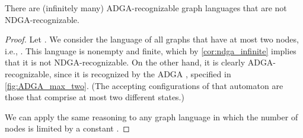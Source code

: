 \documentclass[a4paper,11pt,twoside]{report} \pdfoutput=1
\begin{document}
\begin{lemma}[] \label{lem:ndga<adga}
  There are (infinitely many) ADGA-recognizable graph languages that
  are not NDGA-recognizable.
\end{lemma}

\begin{proof}
  Let . We consider the language  of all
  graphs that have at most two nodes, i.e.,
  . This language is nonempty and finite, which by
  \cref{cor:ndga_infinite} implies that it is not
  NDGA-recognizable. On the other hand, it is clearly
  ADGA-recognizable, since it is recognized by the ADGA ,
  specified in \cref{fig:ADGA_max_two}. (The accepting configurations
  of that automaton are those that comprise at most two different
  states.)

  We can apply the same reasoning to any graph language
   in which the number of nodes is
  limited by a constant .
\end{proof}
\end{document}
